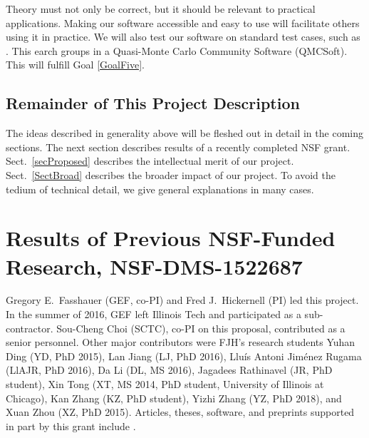 \documentclass[11pt]{NSFamsart}
\begin{document}
Theory must not only be correct, but it should be relevant to practical applications.  Making our software accessible and easy to use will facilitate others using it in practice.  We will also test our software on standard test cases, such as \cite{VirLib17a}.  This earch groups in a Quasi-Monte Carlo Community Software \hypertarget{QMCSoftlink}{(QMCSoft)}.  This will fulfill Goal \ref{GoalFive}.

\subsection{Remainder of This Project Description}

The ideas described in generality above will be fleshed out in detail in the coming sections.  The next section describes results of a recently completed NSF grant.  Sect.\ \ref{secProposed} describes the intellectual merit of our project.  Sect.\ \ref{SectBroad} describes the broader impact of our project.  To avoid the tedium of technical detail, we give general explanations in many cases. 

\section{Results of Previous NSF-Funded Research,
NSF-DMS-1522687} \label{SectPrevious}

Gregory E.\ Fasshauer (GEF, co-PI) and Fred J.\ Hickernell (PI) led this project.  In the summer 
of 2016, GEF left Illinois Tech and participated as a sub-contractor.  
Sou-Cheng Choi (SCTC), co-PI on this proposal, contributed as a senior personnel.  Other major contributors were FJH's research students Yuhan Ding (YD, PhD 2015), Lan Jiang (LJ, PhD 2016), 
Llu\'is Antoni Jim\'enez Rugama (LlAJR, PhD 2016), Da Li (DL, MS 2016), Jagadees Rathinavel (JR, 
PhD student), Xin Tong (XT, MS 2014, PhD student, University of Illinois at Chicago), Kan Zhang (KZ, PhD 
student), Yizhi Zhang (YZ, PhD 2018), and Xuan Zhou (XZ, PhD 2015).  Articles, theses,  
software, and preprints supported in 
part by this 
grant 
include 
\cite{ala_augmented_2017, 
	ChoEtal17a,
	ChoEtal17b,
	Din15a, 
	DinHic20a,
	GilEtal16a,
	Hic17a,
	HicJag18b,
	HicJim16a,
	HicEtal18a,
	HicEtal17a,
	HicKriWoz19a,
	RatHic19a,
	GilJim16b,
	JimHic16a,
	JohFasHic18a,
	Li16a,
	Liu17a,
	MarEtal18a,
	mccourt_stable_2017,
	MCCEtal19a,
	mishra_hybrid_2018,
	MisEtal19a,
	rashidinia_stable_2016,
	rashidinia_stable_2018,
	Zha18a,
	Zha17a,
	Zho15a,
	ZhoHic15a}.
\end{document}
